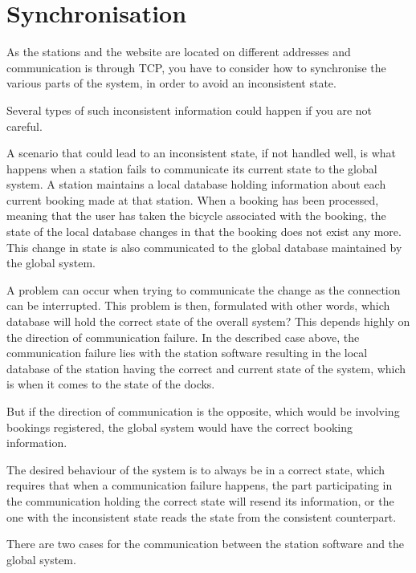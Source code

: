 \section{Synchronisation}\label{sec:sync}
As the stations and the website are located on different addresses and communication is through TCP, you have to consider how to synchronise the various parts of the system, in order to avoid an inconsistent state.

Several types of such inconsistent information could happen if you are not careful.

A scenario that could lead to an inconsistent state, if not handled well, is what happens when a station fails to communicate its current state to the global system.
A station maintains a local database holding information about each current booking made at that station.
When a booking has been processed, meaning that the user has taken the bicycle associated with the booking, the state of the local database changes in that the booking does not exist any more.
This change in state is also communicated to the global database maintained by the global system.

A problem can occur when trying to communicate the change as the connection can be interrupted.
This problem is then, formulated with other words, which database will hold the correct state of the overall system?
This depends highly on the direction of communication failure. 
In the described case above, the communication failure lies with the station software resulting in the local database of the station having the correct and current state of the system, which is when it comes to the state of the docks.


But if the direction of communication is the opposite, which would be involving bookings registered, the global system would have the correct booking information.

The desired behaviour of the system is to always be in a correct state, which requires that when a communication failure happens, the part participating in the communication holding the correct state will resend its information, or the one with the inconsistent state reads the state from the consistent counterpart.

There are two cases for the communication between the station software and the global system.


